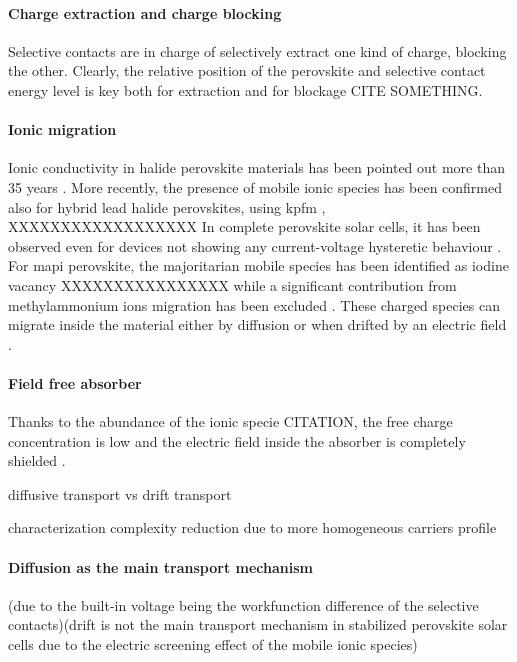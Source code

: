 	\paragraph{Charge extraction and charge blocking}
	Selective contacts are in charge of selectively extract one kind of charge, blocking the other.
	Clearly, the relative position of the perovskite and selective contact energy level is key both for extraction \cite{CorreaBaena2015} and for blockage CITE SOMETHING.

	\paragraph{Ionic migration}
	Ionic conductivity in halide perovskite materials has been pointed out more than 35 years \cite{Mizusaki1983,Yamada1995,Yamada1998}.
	More recently, the presence of mobile ionic species has been confirmed also for hybrid lead halide perovskites, using \gls{kpfm} \cite{Birkhold2018},  XXXXXXXXXXXXXXXXXX
	In complete perovskite solar cells, it has been observed even for devices not showing any current-voltage hysteretic behaviour \cite{Calado2016,Jacobs2018,Bryant2015}.
	For \gls{mapi} perovskite, the majoritarian mobile species has been identified as iodine vacancy XXXXXXXXXXXXXXXX \cite{Yang2015e,Senocrate2017} while a significant contribution from methylammonium ions migration has been excluded \cite{Senocrate2018,Senocrate2017}.
	These charged species can migrate inside the material either by diffusion or when drifted by an electric field \cite{Xiao2015}.

	\paragraph{Field free absorber}
	Thanks to the abundance of the ionic specie CITATION, the free charge concentration is low \cite{Walsh2015} and the electric field inside the absorber is completely shielded \cite{Tress2015}.

	diffusive transport vs drift transport

	characterization complexity reduction due to more homogeneous carriers profile \cite{Kirchartz2012}

	\paragraph{Diffusion as the main transport mechanism}(due to the built-in voltage being the workfunction difference of the selective contacts)(drift is not the main transport mechanism in stabilized perovskite solar cells due to the electric screening effect of the mobile ionic species)


